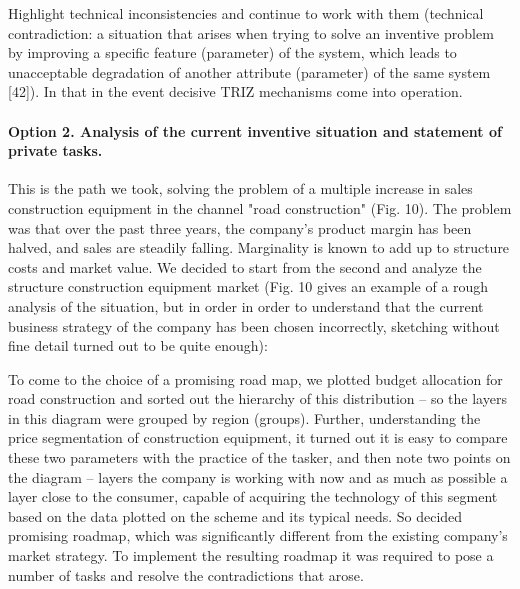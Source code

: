 Highlight technical inconsistencies and continue to work with them (technical
contradiction: a situation that arises when trying to solve an inventive
problem by improving a specific feature (parameter) of the system, which leads
to unacceptable degradation of another attribute (parameter) of the same
system [42]). In that in the event decisive TRIZ mechanisms come into
operation.

\paragraph{Option 2. Analysis of the current inventive situation and statement
  of private tasks.}

This is the path we took, solving the problem of a multiple increase in sales
construction equipment in the channel "road construction" (Fig. 10). The
problem was that over the past three years, the company's product margin has
been halved, and sales are steadily falling. Marginality is known to add up to
structure costs and market value. We decided to start from the second and
analyze the structure construction equipment market (Fig. 10 gives an example
of a rough analysis of the situation, but in order in order to understand that
the current business strategy of the company has been chosen incorrectly,
sketching without fine detail turned out to be quite enough):


To come to the choice of a promising road map, we plotted budget allocation
for road construction and sorted out the hierarchy of this distribution -- so
the layers in this diagram were grouped by region (groups). Further,
understanding the price segmentation of construction equipment, it turned out
it is easy to compare these two parameters with the practice of the tasker,
and then note two points on the diagram -- layers the company is working with
now and as much as possible a layer close to the consumer, capable of
acquiring the technology of this segment based on the data plotted on the
scheme and its typical needs. So decided promising roadmap, which was
significantly different from the existing company’s market strategy. To
implement the resulting roadmap it was required to pose a number of tasks and
resolve the contradictions that arose.

